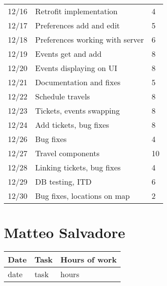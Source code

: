\begin{table}[H]
\begin{tabular}{ p{2cm} p{10cm} p{3cm}}
	12/16 & Retrofit implementation & 4 \\
	12/17 & Preferences add and edit & 5 \\
	12/18 & Preferences working with server & 6 \\
	12/19 & Events get and add & 8 \\
	12/20 & Events displaying on UI & 8 \\
	12/21 & Documentation and fixes & 5 \\
	12/22 & Schedule travels & 8 \\
	12/23 & Tickets, events swapping & 8 \\
	12/24 & Add tickets, bug fixes & 8 \\
	12/26 & Bug fixes & 4 \\
	12/27 & Travel components & 10 \\
	12/28 & Linking tickets, bug fixes & 4 \\
	12/29 & DB testing, ITD & 6 \\
	12/30 & Bug fixes, locations on map & 2 \\
	\end{tabular}
\end{table}

\section{Matteo Salvadore}
\begin{table}[H]
	\begin{tabular}{ p{2cm} p{10cm} p{3cm}}
	Date & Task & Hours of work\\
	\hline
	date & task & hours \\
	\end{tabular}
\end{table}